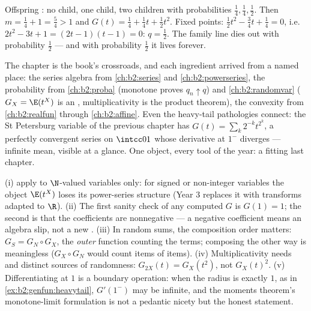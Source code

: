 \begin{example}\label{ex:b2:genfun:branchingexample}
Offspring : no child, one child, two children with
probabilities $\frac14, \frac14, \frac12$. Then $m = \frac14 + 1 =
\frac54 > 1$ and $G(t) = \frac14 + \frac14 t + \frac12 t^2$. Fixed
points: $\frac12 t^2 - \frac34 t + \frac14 = 0$, i.e.\ $2t^2 - 3t
+ 1 = (2t - 1)(t - 1) = 0$: $q = \frac12$. The family line dies
out with probability $\frac12$ --- and with probability $\frac12$
it lives forever.
\end{example}

\begin{remark}
The chapter is the book's crossroads, and each ingredient
arrived from a named place: the series algebra from
\cref{ch:b2:series} and \cref{ch:b2:powerseries}, the
probability from \cref{ch:b2:proba} (monotone 
proves $q_n \uparrow q$) and \cref{ch:b2:randomvar} ($G_X =
\E(t^X)$ is an , multiplicativity is the product
theorem), the convexity from \cref{ch:b2:realfun} through
\cref{ch:b2:affine}. Even the heavy-tail pathologies connect:
the St Petersburg variable of the previous chapter has
$G(t) = \sum_k2^{-k}t^{2^k}$, a perfectly convergent series
on $\intcc01$ whose derivative at $1^-$ diverges ---
infinite mean, visible at a glance. One object, every tool
of the year: a fitting last chapter.
\end{remark}

\begin{remark}
(i)  apply to $\N$-valued variables only:
for signed or non-integer variables the object $\E(t^X)$
loses its power-series structure (Year 3 replaces it with
transforms adapted to $\R$). (ii) The first sanity check of
any computed $G$ is $G(1) = 1$; the second is that the
coefficients are nonnegative --- a negative coefficient
means an algebra slip, not a new . (iii) In random sums,
the composition order matters: $G_S = G_N \circ G_X$, the
\emph{outer} function counting the terms; composing the
other way is meaningless ($G_X \circ G_N$ would count items
of items). (iv) Multiplicativity needs  and
distinct sources of randomness: $G_{2X}(t) = G_X(t^2)$, not
$G_X(t)^2$. (v) Differentiating at $1$ is a boundary
operation: when the radius is exactly $1$, as in
\cref{ex:b2:genfun:heavytail}, $G'(1^-)$ may be infinite,
and the moments theorem's monotone-limit formulation is not
a pedantic nicety but the honest statement.
\end{remark}

